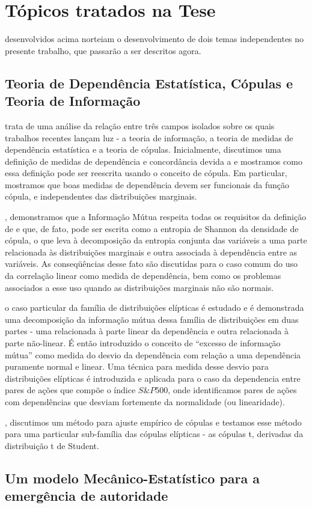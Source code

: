 \section{Tópicos tratados na Tese}
 desenvolvidos acima norteiam o desenvolvimento de dois temas independentes no presente trabalho, que passarão a ser descritos agora. 

\subsection{Teoria de Dependência Estatística, Cópulas e Teoria de Informação}

 trata de uma análise da relação entre três campos isolados sobre os quais trabalhos recentes lançam luz - a teoria de informação, a teoria de medidas de dependência estatística e a teoria de cópulas. Inicialmente, discutimos uma definição de medidas de dependência e concordância devida a \citet{Renyi1959} e mostramos como essa definição pode ser reescrita usando o conceito de cópula. Em particular, mostramos que boas medidas de dependência devem ser funcionais da função cópula, e independentes das distribuições marginais. 

, demonstramos que a Informação Mútua respeita todas os requisitos da definição de \citet{Renyi1959} e que, de fato, pode ser escrita como a entropia de Shannon da densidade de cópula, o que leva à decomposição da entropia conjunta das variáveis a uma parte relacionada às distribuições marginais e outra associada à dependência entre as variáveis. As conseqüências desse fato são discutidas para o caso comum do uso da correlação linear como medida de dependência, bem como os problemas associados a esse uso quando as distribuições marginais não são normais. 

 o caso particular da família de distribuições elípticas é estudado e é demonstrada uma decomposição da informação mútua dessa família de distribuições em duas partes - uma relacionada à parte linear da dependência e outra relacionada à parte não-linear. É então introduzido o conceito de ``excesso de informação mútua'' como medida do desvio da dependência com relação a uma dependência puramente normal e linear. Uma técnica para medida desse desvio para distribuições elípticas é introduzida e aplicada para o caso da dependencia entre pares de ações que compõe o índice $S\&P500$, onde identificamos pares de ações com dependências que desviam fortemente da normalidade (ou linearidade).

, discutimos um método para ajuste empírico de cópulas e testamos esse método para uma particular sub-família das cópulas elípticas - as cópulas t, derivadas da distribuição t de Student. 


\subsection{Um modelo Mecânico-Estatístico para a emergência de autoridade}